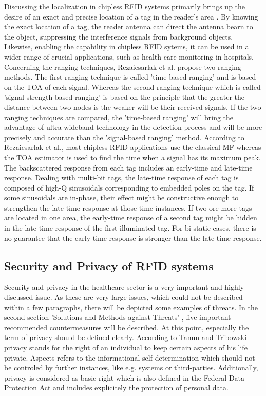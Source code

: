 Discussing the localization in chipless RFID systems primarily brings up the desire of an exact and precise location of a tag in the reader's area \cite[p.143 ff.]{chipless}. By knowing the exact location of a tag, the reader antenna can direct the antenna bearn to the object, suppressing the interference signals from background objects. Likewise, enabling the capability in chipless RFID sytems, it can be used in a wider range of crucial applications, such as health-care monitoring in hospitals.
Concerning the ranging techniques, Rezaiesarlak et al. \cite[p. 143 ff.]{chipless} propose two ranging methods. The first ranging technique is called 'time-based ranging' and is based on the \ac{TOA} of each signal. Whereas the second ranging technique which is called 'signal-strength-based ranging' is based on the principle that the greater the distance between two nodes is the weaker will be their received signals. If the two ranging techniques are compared, the 'time-based ranging' will bring the advantage of ultra-wideband technology in the detection process and will be more precisely and accurate than the 'signal-based ranging' method. 
According to Rezaiesarlak et al., most chipless RFID applications use the classical \ac{MF} whereas the TOA estimator is used to find the time when a signal has its maximum peak. The backscattered response from each tag includes an early-time and late-time response. Dealing with multi-bit tags, the late-time response of each tag is composed of high-Q sinusoidals corresponding to embedded poles on the tag. If some sinusoidals are in-phase, their effect might be constructive enough to strengthen the late-time response at those time instances. If two ore more tags are located in one area, the early-time response of a second tag might be hidden in the late-time response of the first illuminated tag. For bi-static cases, there is no guarantee that the early-time response is stronger than the late-time response. 
 
\subsection{Security and Privacy of RFID systems}

Security and privacy in the healthcare sector is a very important and highly discussed issue. As these are very large issues, which could not be described within a few paragraphs, there will be depicted some examples of threats. In the second section 'Solutions and Methods against Threats' \pageref{solution}, five important recommended countermeasures will be described. 
At this point, especially the term of privacy should be defined clearly. According to Tamm and Tribowski \cite[p.90 ff.]{fokus} privacy stands for the right of an individual to keep certain aspects of his life private. Aspects refers to the informational self-determination which should not be controled by further instances, like e.g. systems or third-parties. Additionally, privacy is considered as basic right which is also defined in the Federal Data Protection Act and includes explicitely the protection of personal data.

